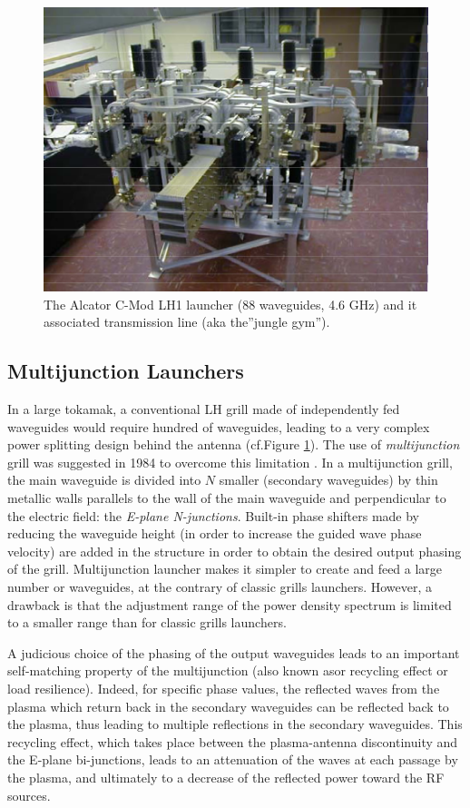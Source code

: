 \begin{figure}
\centering
\includegraphics[width=0.7\linewidth]{Figures/LHCD/CMod_LH1}
\caption{The Alcator C-Mod LH1 launcher (88 waveguides, 4.6 GHz) and it associated transmission line (aka the”jungle gym”).}
\label{fig:cmodlh1}
\end{figure}

\subsection{Multijunction Launchers}
In a large tokamak, a conventional LH grill made of independently fed waveguides would require hundred of waveguides, leading to a very complex power splitting design behind the antenna (cf.Figure \ref{fig:cmodlh1}). The use of \emph{multijunction} grill was suggested in 1984 to overcome this limitation \parencite{Gormezano1985, Moreau1984}. In a multijunction grill, the main waveguide is divided into $N$ smaller (secondary waveguides) by thin metallic walls parallels to the wall of the main waveguide and perpendicular to the electric field: the \emph{E-plane N-junctions}. Built-in phase shifters made by reducing the waveguide height (in order to increase the guided wave phase velocity) are added in the structure in order to obtain the desired output phasing of the grill. Multijunction launcher makes it simpler to create and feed a large number or waveguides, at the contrary of classic grills launchers. However, a drawback is that the adjustment range of the power density spectrum is limited to a smaller range than for classic grills launchers.

A judicious choice of the phasing of the output waveguides leads to an important self-matching property of the multijunction (also known asor recycling effect or load resilience). Indeed, for specific phase values, the reflected waves from the plasma which return back in the secondary waveguides can be reflected back to the plasma, thus leading to multiple reflections in the secondary waveguides. This recycling effect, which takes place between the plasma-antenna discontinuity and the E-plane bi-junctions, leads to an attenuation of the waves at each passage by the plasma, and ultimately to a decrease of the reflected power toward the RF sources. 

